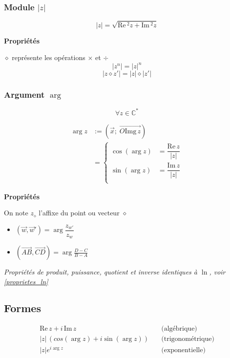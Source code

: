 \documentclass{article}
\newcommand{\im}{\text{Im}\,}
\newcommand{\re}{\text{Re}\,}
\newcommand{\img}{\text{Img}\,}
\newcommand{\C}{\mathds{C}}
\newcommand{\placeholder}{\diamond}
\newcommand{\vect}[1]{\overrightarrow{#1}}
\begin{document}
\subsubsection{Module $|z|$}

\[|z| = \sqrt{\re^2z + \im^2z}\]

\textbf{Propriétés}

$\placeholder$ représente les opérations $\times$ et $\div$
\[ |z^n| = |z|^n \]
\[ | z \placeholder z' | = |z|\placeholder|z'|\]


\subsubsection{Argument $\arg$}

\[\forall z \in \C^\ast\]

\begin{equation*}
    \begin{split}
        \arg z &:= \left( \vec x ;\; \vect{O \img z} \right) \\
            &= \begin{cases}
            \cos(\arg z) &= \dfrac{\re z}{|z|} \\
            \sin(\arg z) &= \dfrac{\im z}{|z|} \\
            \end{cases}
    \end{split}
\end{equation*}

\textbf{Propriétés}

On note $z_\placeholder$ l'affixe du point ou vecteur $\placeholder$

\begin{itemize}
    \item $(\vec w, \vect w') = \arg{\dfrac{z_{w'}}{z_w}}$
    \item $(\vect{AB}, \vect{CD}) = \arg{\frac{D-C}{B-A}}$
\end{itemize}

\textit{Propriétés de produit, puissance, quotient et inverse identiques à $\ln$, voir \ref{proprietes_ln}}


\subsection{Formes}

\begin{equation*}
    \begin{split}
        \re z + i\,\im z&\quad\text{(algébrique)} \\
          |z|\,(cos(\arg z) + i \sin(\arg z) )&\quad\text{(trigonométrique)} \\
          |z|e^{i\arg z}&\quad\text{(exponentielle)}
    \end{split}
\end{equation*}
\end{document}
